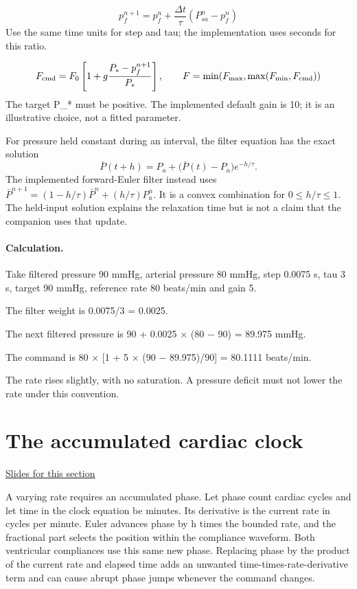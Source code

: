 \documentclass[11pt,letterpaper]{article}
\theoremstyle{definition}\newtheorem{definition}{Definition}\newtheorem{example}{Example}
\numberwithin{equation}{section}
\begin{document}
\[
p_f^{n+1}=p_f^n+\frac{\Delta t}{\tau}(P_{sa}^n-p_f^n)
\]
Use the same time units for step and tau; the implementation uses seconds for this ratio.

\[
F_{\rm cmd}=F_0\left[1+g\frac{P_*-p_f^{n+1}}{P_*}\right],\qquad F=\min(F_{\max},\max(F_{\min},F_{\rm cmd}))
\]
The target P\_* must be positive. The implemented default gain is 10; it is an illustrative choice, not a fitted parameter.

For pressure held constant during an interval, the filter equation has the exact solution
\[
 \bar P(t+h)=P_a+\bigl(\bar P(t)-P_a\bigr)e^{-h/\tau}.
\]
The implemented forward-Euler filter instead uses $\bar P^{n+1}=(1-h/\tau)\bar P^n+(h/\tau)P_a^n$. It is a convex combination for $0\le h/\tau\le1$. The held-input solution explains the relaxation time but is not a claim that the companion uses that update.

\paragraph{Calculation.} Take filtered pressure 90 mmHg, arterial pressure 80 mmHg, step 0.0075 s, tau 3 s, target 90 mmHg, reference rate 80 beats/min and gain 5.

The filter weight is 0.0075/3 = 0.0025.

The next filtered pressure is 90 + 0.0025 \ensuremath{\times} (80 \ensuremath{-} 90) = 89.975 mmHg.

The command is 80 \ensuremath{\times} [1 + 5 \ensuremath{\times} (90 \ensuremath{-} 89.975)/90] = 80.1111 beats/min.

The rate rises slightly, with no saturation. A pressure deficit must not lower the rate under this convention.
\section{The accumulated cardiac clock}
\hypertarget{note-the-accumulated-cardiac-clock}{}\label{note:the-accumulated-cardiac-clock}
{\small \href{slides.html\#frame=a-continuously-varying-clock\&step=1}{Slides for this section}}\par
A varying rate requires an accumulated phase. Let phase count cardiac cycles and let time in the clock equation be minutes. Its derivative is the current rate in cycles per minute. Euler advances phase by h times the bounded rate, and the fractional part selects the position within the compliance waveform. Both ventricular compliances use this same new phase. Replacing phase by the product of the current rate and elapsed time adds an unwanted time-times-rate-derivative term and can cause abrupt phase jumps whenever the command changes.
\end{document}
